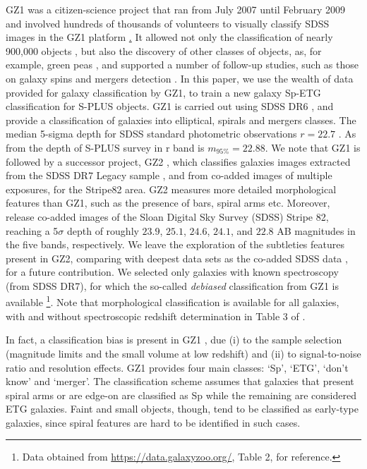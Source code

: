 \documentclass[fleqn,usenatbib]{mnras}
\begin{document}
GZ1 was a citizen-science project that ran from July 2007 until February 2009 and involved hundreds of thousands of volunteers to visually classify SDSS images in the GZ1 platform \href{https://www.zooniverse.org/projects/zookeeper/galaxy-zoo/}. It allowed not only the classification of nearly 900,000 objects \citep{lintott2008,lintott2011}, but also the discovery of other classes of objects, as, for example, green peas \citep{Cardamone_2009,lintott2008}, and supported a number of follow-up studies, such as those on galaxy spins \citep{Land_2008, Slosar_2009} and mergers detection  \citep{Holincheck2016}.   
In this paper, we use the wealth of data provided for galaxy classification by GZ1, to train a new galaxy Sp-ETG classification for S-PLUS objects. GZ1 is carried out using SDSS DR6 \citep{Adelman-McCarthy2008}, and provide a classification of galaxies into  elliptical, spirals and mergers classes. The median 5-sigma depth for SDSS standard  photometric observations $r = 22.7$ \citep{Adelman-McCarthy2008,Abazajian_2009}.  As from \citet{mendes_de_oliveira2019} the depth of S-PLUS survey in r band is $m_{95\%} = 22.88$.
We note that GZ1 is followed by a successor project, GZ2 \citep{Willett2013}, which classifies galaxies images extracted from the SDSS DR7 Legacy sample \citep{Abazajian_2009}, and from  co-added images of multiple exposures, for the Stripe82 area. GZ2 measures more detailed morphological features than GZ1, such as the presence of bars, spiral arms etc. Moreover, \citet{Jiang2014} release co-added images of the Sloan Digital Sky Survey (SDSS) Stripe 82, reaching a  5$\sigma$ depth  of roughly $23.9$, $25.1$, $24.6$, $24.1$, and $22.8$ AB magnitudes in the five bands, respectively. We leave the exploration of the subtleties features present in GZ2, comparing with deepest data sets as the co-added SDSS data \citet{Jiang2014}, for a future contribution. We selected only galaxies with known spectroscopy (from SDSS DR7), for which the so-called \textit{debiased} classification \citep{bamford2009galaxy} from GZ1 is available \citep{lintott2011}\footnote{Data obtained from \href{https://data.galaxyzoo.org/}{https://data.galaxyzoo.org/}, Table 2, for reference.}. Note that morphological classification is available for all galaxies, with and without spectroscopic redshift determination in Table 3 of  \citet{lintott2011}.

 In fact, a classification bias is present in GZ1 \citep{bamford2009galaxy, lintott2011}, due (i)  to the sample selection (magnitude limits and the small volume at low redshift) and (ii) to signal-to-noise ratio and resolution effects. GZ1 provides four main classes: `Sp', `ETG', `don't know' and `merger'. The classification scheme assumes that galaxies that present spiral arms or are edge-on are classified as Sp while the remaining are considered ETG galaxies. Faint and small objects, though, tend to be classified as early-type galaxies, since spiral features are hard to be identified in such cases. 
 
\end{document}

